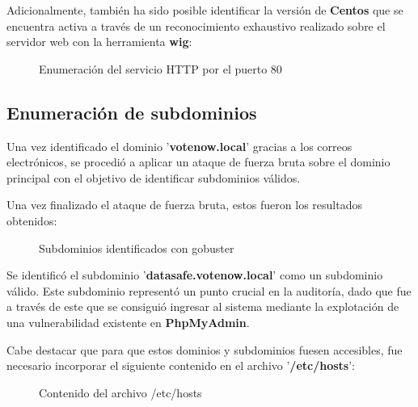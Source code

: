 \documentclass[a4paper]{article} %
\begin{document}
  Adicionalmente, también ha sido posible identificar la versión de \textbf{Centos} que se encuentra activa a 
  través de un reconocimiento exhaustivo realizado sobre el servidor web con la herramienta \textbf{wig}:
  
  \vspace{0.1cm}
  \begin{figure}[h]
    \centering 
    \setlength{\fboxrule}{0.8pt}
    \caption{Enumeración del servicio HTTP por el puerto 80}
  \end{figure}

  \clearpage
  \subsection{Enumeración de subdominios}
  Una vez identificado el dominio '\textbf{votenow.local}' gracias a los correos electrónicos, se procedió a 
  aplicar un ataque de fuerza bruta sobre el dominio principal con el objetivo de identificar subdominios 
  válidos.

  Una vez finalizado el ataque de fuerza bruta, estos fueron los resultados obtenidos: 
  
  \vspace{0.1cm}
  \begin{figure}[h]
    \centering 
    \setlength{\fboxrule}{0.8pt}  
    \caption{Subdominios identificados con gobuster}
    \label{fig:identifiedSubdomains}
  \end{figure}

  \vspace{0.3cm}

  Se identificó el subdominio '\textbf{datasafe.votenow.local}' como un subdominio válido. Este subdominio
  representó un punto crucial en la auditoría, dado que fue a través de este que se consiguió ingresar al sistema 
  mediante la explotación de una vulnerabilidad existente en \textbf{PhpMyAdmin}. 

  Cabe destacar que para que estos dominios y subdominios fuesen accesibles, fue necesario incorporar el siguiente 
  contenido en el archivo '\textbf{/etc/hosts}':

  \begin{figure}[h]
    \centering 
    \setlength{\fboxrule}{0.8pt}  
    \caption{Contenido del archivo /etc/hosts}
    \label{fig:identifiedSubdomains}
  \end{figure}
\end{document}
